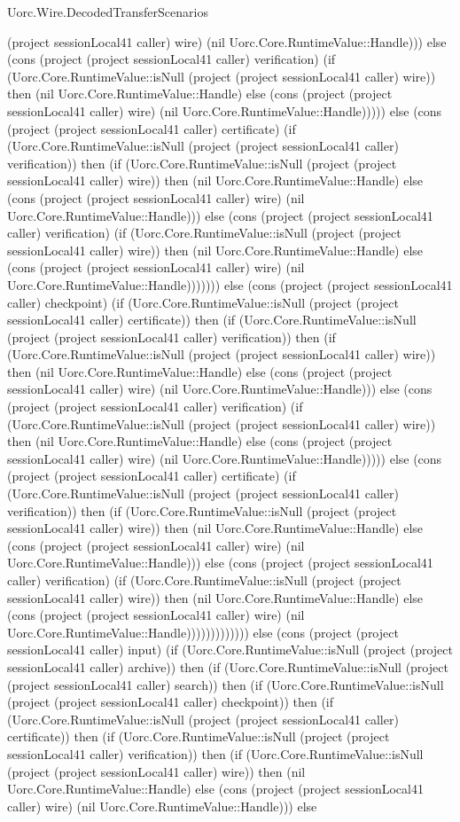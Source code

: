 \begin{lexlean}{Uorc.Wire.DecodedTransferScenarios}
\begin{semanticmodule}
{(project sessionLocal41 caller) wire) (nil Uorc.Core.RuntimeValue::Handle))) else (cons (project (project sessionLocal41 caller) verification) (if (Uorc.Core.RuntimeValue::isNull (project (project sessionLocal41 caller) wire)) then (nil Uorc.Core.RuntimeValue::Handle) else (cons (project (project sessionLocal41 caller) wire) (nil Uorc.Core.RuntimeValue::Handle))))) else (cons (project (project sessionLocal41 caller) certificate) (if (Uorc.Core.RuntimeValue::isNull (project (project sessionLocal41 caller) verification)) then (if (Uorc.Core.RuntimeValue::isNull (project (project sessionLocal41 caller) wire)) then (nil Uorc.Core.RuntimeValue::Handle) else (cons (project (project sessionLocal41 caller) wire) (nil Uorc.Core.RuntimeValue::Handle))) else (cons (project (project sessionLocal41 caller) verification) (if (Uorc.Core.RuntimeValue::isNull (project (project sessionLocal41 caller) wire)) then (nil Uorc.Core.RuntimeValue::Handle) else (cons (project (project sessionLocal41 caller) wire) (nil Uorc.Core.RuntimeValue::Handle))))))) else (cons (project (project sessionLocal41 caller) checkpoint) (if (Uorc.Core.RuntimeValue::isNull (project (project sessionLocal41 caller) certificate)) then (if (Uorc.Core.RuntimeValue::isNull (project (project sessionLocal41 caller) verification)) then (if (Uorc.Core.RuntimeValue::isNull (project (project sessionLocal41 caller) wire)) then (nil Uorc.Core.RuntimeValue::Handle) else (cons (project (project sessionLocal41 caller) wire) (nil Uorc.Core.RuntimeValue::Handle))) else (cons (project (project sessionLocal41 caller) verification) (if (Uorc.Core.RuntimeValue::isNull (project (project sessionLocal41 caller) wire)) then (nil Uorc.Core.RuntimeValue::Handle) else (cons (project (project sessionLocal41 caller) wire) (nil Uorc.Core.RuntimeValue::Handle))))) else (cons (project (project sessionLocal41 caller) certificate) (if (Uorc.Core.RuntimeValue::isNull (project (project sessionLocal41 caller) verification)) then (if (Uorc.Core.RuntimeValue::isNull (project (project sessionLocal41 caller) wire)) then (nil Uorc.Core.RuntimeValue::Handle) else (cons (project (project sessionLocal41 caller) wire) (nil Uorc.Core.RuntimeValue::Handle))) else (cons (project (project sessionLocal41 caller) verification) (if (Uorc.Core.RuntimeValue::isNull (project (project sessionLocal41 caller) wire)) then (nil Uorc.Core.RuntimeValue::Handle) else (cons (project (project sessionLocal41 caller) wire) (nil Uorc.Core.RuntimeValue::Handle))))))))))))) else (cons (project (project sessionLocal41 caller) input) (if (Uorc.Core.RuntimeValue::isNull (project (project sessionLocal41 caller) archive)) then (if (Uorc.Core.RuntimeValue::isNull (project (project sessionLocal41 caller) search)) then (if (Uorc.Core.RuntimeValue::isNull (project (project sessionLocal41 caller) checkpoint)) then (if (Uorc.Core.RuntimeValue::isNull (project (project sessionLocal41 caller) certificate)) then (if (Uorc.Core.RuntimeValue::isNull (project (project sessionLocal41 caller) verification)) then (if (Uorc.Core.RuntimeValue::isNull (project (project sessionLocal41 caller) wire)) then (nil Uorc.Core.RuntimeValue::Handle) else (cons (project (project sessionLocal41 caller) wire) (nil Uorc.Core.RuntimeValue::Handle))) else }
\end{semanticmodule}
\end{lexlean}
